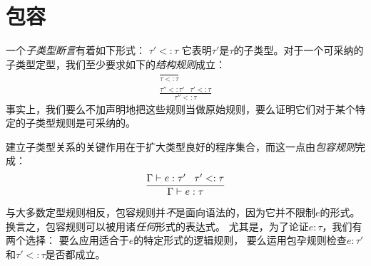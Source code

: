 \section{包容}
一个\textit{子类型断言}有着如下形式：
$\tau{'} <: \tau$
它表明$\tau{'}$是$\tau$的子类型。对于一个可采纳的子类型定型，我们至少要求如下的\textit{结构规则}成立：
\begin{subequations}
    \begin{gather}
        \frac{}{\tau<:\tau} \\
        \frac{\tau{''}<:\tau{'}\;\;\;\tau{'}<:\tau}{\tau{''}<:\tau}
    \end{gather}
\end{subequations}
事实上，我们要么不加声明地把这些规则当做原始规则，要么证明它们对于某个特定的子类型规则是可采纳的。

建立子类型关系的关键作用在于扩大类型良好的程序集合，而这一点由\textit{包容规则}完成：
\begin{equation}\label{equation:subsumption_rule}
    \frac{\Gamma\vdash\mathnormal{e}:\tau{'}\;\;\;\tau'<:\tau}{\Gamma\vdash e:\tau}
\end{equation}

与大多数定型规则相反，包容规则并\textit{不}是面向语法的，因为它并不限制$e$的形式。
换言之，包容规则可以被用诸\textit{任何}形式的表达式。
尤其是，为了论证$e:\tau$，我们有两个选择：
要么应用适合于$e$的特定形式的逻辑规则，
要么运用包孕规则检查$e:\tau{'}$和$\tau{'}<:\tau$是否都成立。


